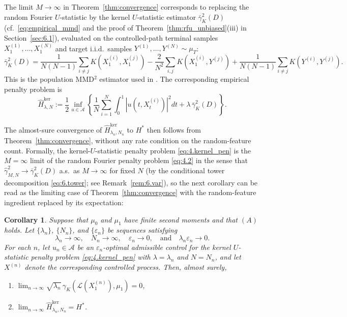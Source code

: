 \documentclass[11pt,leqno]{article}
\theoremstyle{plain}
\newtheorem{cor}[thm]{Corollary}
\theoremstyle{remark}
\theoremstyle{definition}
\numberwithin{equation}{section}
\numberwithin{figure}{section}
\numberwithin{table}{section}
\numberwithin{algorithm}{section}
\begin{document}
The limit $M\to\infty$ in Theorem~\ref{thm:convergence} corresponds to replacing the random Fourier
$U$-statistic by the kernel $U$-statistic estimator $\bar{\gamma}_K^2(D)$
(cf.~\eqref{eq:empirical_mmd} and the proof of Theorem~\ref{thm:rfu_unbiased}(iii) in Section~\ref{sec:6.1}),
evaluated on the controlled-path terminal samples $X_1^{(1)},\ldots,X_1^{(N)}$ and target i.i.d.\ samples $Y^{(1)},\ldots,Y^{(N)}\sim\mu_T$:
\begin{equation}\label{eq:4.kernelUstat}
 \bar{\gamma}_K^2(D)
 = \frac{1}{N(N-1)}\sum_{i\neq j}K(X_1^{(i)},X_1^{(j)})
   - \frac{2}{N^2}\sum_{i,j}K(X_1^{(i)},Y^{(j)})
   + \frac{1}{N(N-1)}\sum_{i\neq j}K(Y^{(i)},Y^{(j)}).
\end{equation}
This is the population MMD${}^2$ estimator used in \cite{nak:2024sb}.
The corresponding empirical penalty problem is
\begin{equation}\label{eq:4.kernel_pen}
 \hat{H}_{\lambda,N}^{\mathrm{ker}}
 := \frac{1}{2}\inf_{u\in\mathcal{A}}\!\left\{
 \frac{1}{N}\sum_{i=1}^N\!\int_0^1|u(t,X_t^{(i)})|^2 dt
 + \lambda\,\bar{\gamma}_K^2(D)\right\}.
\end{equation}

The almost-sure convergence of $\hat{H}_{\lambda_n,N_n}^{\mathrm{ker}}$ to $H^*$ then follows from Theorem~\ref{thm:convergence}, without any rate condition on the random-feature count.
Formally, the kernel-$U$-statistic penalty problem \eqref{eq:4.kernel_pen}
is the $M=\infty$ limit of the random Fourier penalty problem \eqref{eq:4.2}
in the sense that $\hat{\gamma}_{M,N}^2\to \bar{\gamma}_K^2(D)$ a.s.\ as $M\to\infty$ for fixed $N$
(by the conditional tower decomposition \eqref{eq:6.tower}; see Remark~\ref{rem:6.var}),
so the next corollary can be read as the limiting case of Theorem~\ref{thm:convergence}
with the random-feature ingredient replaced by its expectation:

\begin{cor}\label{cor:kernel_convergence}
Suppose that $\mu_0$ and $\mu_1$ have finite second moments and that $(A)$ holds.
Let $\{\lambda_n\}$, $\{N_n\}$, and $\{\varepsilon_n\}$ be sequences satisfying
\[
 \lambda_n\to\infty,\quad N_n\to\infty,\quad \varepsilon_n\to 0,\quad \text{and}\quad \lambda_n\varepsilon_n\to 0.
\]
For each $n$, let $u_n\in\mathcal{A}$ be an $\varepsilon_n$-optimal admissible control for the kernel $U$-statistic
penalty problem \eqref{eq:4.kernel_pen} with $\lambda=\lambda_n$ and $N=N_n$,
and let $X^{(n)}$ denote the corresponding controlled process.
Then, almost surely,
\begin{enumerate}[label=\textup{(\roman*)}]
\item $\displaystyle\lim_{n\to\infty}\sqrt{\lambda_n}\,\gamma_K(\mathcal{L}(X_1^{(n)}),\mu_1)=0$,
\item $\displaystyle\lim_{n\to\infty}\hat{H}_{\lambda_n,N_n}^{\mathrm{ker}} = H^*$.
\end{enumerate}
\end{cor}
\end{document}
